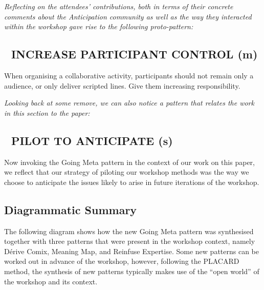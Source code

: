 \documentclass[acmlarge,timestamp]{acmart}
\newcommand{\sensory}{(s)}
\newcommand{\motor}{(m)}
\begin{document}
\medskip

\noindent \emph{Reflecting on the attendees’ contributions, both in
terms of their concrete comments about the Anticipation community as
well as the way they interacted within the workshop gave rise to the
following proto-pattern:}

\subsection*{💎 INCREASE PARTICIPANT CONTROL {\hfill \motor}}

When organising a collaborative activity, participants should not
remain only a audience, or only deliver scripted lines.  Give them
increasing responsibility.

\medskip

\noindent \emph{Looking back at some remove, we can also notice a
pattern that relates the work in this section to the paper:}

\subsection*{💎 PILOT TO ANTICIPATE {\hfill \sensory}}

Now invoking the {\sc Going Meta} pattern in the context of our work
on this paper, we reflect that our strategy of piloting our workshop
methods was the way we choose to anticipate the issues likely to arise
in future iterations of the workshop.

\newpage
\subsection{Diagrammatic Summary}\label{illustrative_diagram}
The following diagram shows how the new {\sc Going Meta} pattern was
synthesised together with three patterns that were present in the
workshop context, namely {\sc Dérive Comix}, {\sc Meaning Map}, and
{\sc Reinfuse Expertise}.  Some new patterns can be worked out in
advance of the workshop, however, following the PLACARD method, the
synthesis of new patterns typically makes use of the “open world” of
the workshop and its context.
\end{document}
